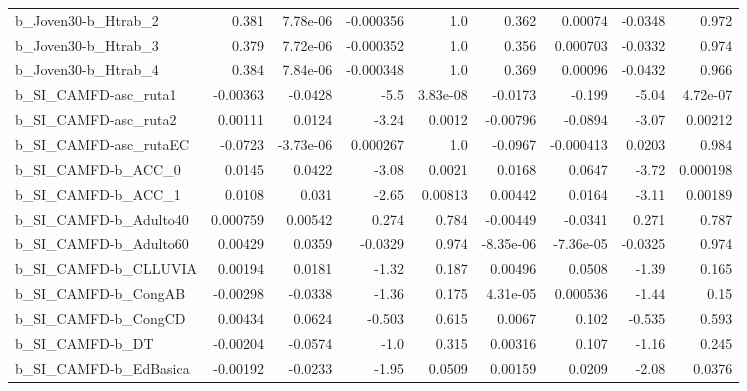\begin{tabular}{lrrrrrrrr}
b\_Joven30-b\_Htrab\_2        &       0.381 &     7.78e-06 & -0.000356 &      1.0 &      0.362 &     0.00074 &      -0.0348 &         0.972 \\
b\_Joven30-b\_Htrab\_3        &       0.379 &     7.72e-06 & -0.000352 &      1.0 &      0.356 &    0.000703 &      -0.0332 &         0.974 \\
b\_Joven30-b\_Htrab\_4        &       0.384 &     7.84e-06 & -0.000348 &      1.0 &      0.369 &     0.00096 &      -0.0432 &         0.966 \\
b\_SI\_CAMFD-asc\_ruta1       &    -0.00363 &      -0.0428 &      -5.5 & 3.83e-08 &    -0.0173 &      -0.199 &        -5.04 &      4.72e-07 \\
b\_SI\_CAMFD-asc\_ruta2       &     0.00111 &       0.0124 &     -3.24 &   0.0012 &   -0.00796 &     -0.0894 &        -3.07 &       0.00212 \\
b\_SI\_CAMFD-asc\_rutaEC      &     -0.0723 &    -3.73e-06 &  0.000267 &      1.0 &    -0.0967 &   -0.000413 &       0.0203 &         0.984 \\
b\_SI\_CAMFD-b\_ACC\_0         &      0.0145 &       0.0422 &     -3.08 &   0.0021 &     0.0168 &      0.0647 &        -3.72 &      0.000198 \\
b\_SI\_CAMFD-b\_ACC\_1         &      0.0108 &        0.031 &     -2.65 &  0.00813 &    0.00442 &      0.0164 &        -3.11 &       0.00189 \\
b\_SI\_CAMFD-b\_Adulto40      &    0.000759 &      0.00542 &     0.274 &    0.784 &   -0.00449 &     -0.0341 &        0.271 &         0.787 \\
b\_SI\_CAMFD-b\_Adulto60      &     0.00429 &       0.0359 &   -0.0329 &    0.974 &  -8.35e-06 &   -7.36e-05 &      -0.0325 &         0.974 \\
b\_SI\_CAMFD-b\_CLLUVIA       &     0.00194 &       0.0181 &     -1.32 &    0.187 &    0.00496 &      0.0508 &        -1.39 &         0.165 \\
b\_SI\_CAMFD-b\_CongAB        &    -0.00298 &      -0.0338 &     -1.36 &    0.175 &   4.31e-05 &    0.000536 &        -1.44 &          0.15 \\
b\_SI\_CAMFD-b\_CongCD        &     0.00434 &       0.0624 &    -0.503 &    0.615 &     0.0067 &       0.102 &       -0.535 &         0.593 \\
b\_SI\_CAMFD-b\_DT            &    -0.00204 &      -0.0574 &      -1.0 &    0.315 &    0.00316 &       0.107 &        -1.16 &         0.245 \\
b\_SI\_CAMFD-b\_EdBasica      &    -0.00192 &      -0.0233 &     -1.95 &   0.0509 &    0.00159 &      0.0209 &        -2.08 &        0.0376 \\

\end{tabular}
